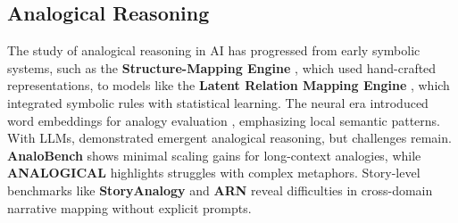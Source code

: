 \subsection{Analogical Reasoning} 
The study of analogical reasoning in AI has progressed from early symbolic systems, such as the \textbf{Structure-Mapping Engine} \citep{FALKENHAINER19891}, which used hand-crafted representations, to models like the \textbf{Latent Relation Mapping Engine} \citep{Turney_2008}, which integrated symbolic rules with statistical learning. The neural era introduced word embeddings for analogy evaluation \citep{mikolov2013distributedrepresentationswordsphrases}, emphasizing local semantic patterns. With LLMs, \citet{webb2023emergentanalogicalreasoninglarge} demonstrated emergent analogical reasoning, but challenges remain. \textbf{AnaloBench} \citep{ye2024analobenchbenchmarkingidentificationabstract} shows minimal scaling gains for long-context analogies, while \textbf{ANALOGICAL} \citep{wijesiriwardene2023analogicalnovelbenchmark} highlights struggles with complex metaphors. Story-level benchmarks like \textbf{StoryAnalogy} \citep{jiayang2023storyanalogyderivingstorylevelanalogies} and \textbf{ARN} \citep{sourati2024arnanalogicalreasoningnarratives} reveal difficulties in cross-domain narrative mapping without explicit prompts.